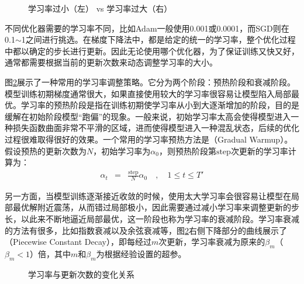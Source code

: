 \begin{figure}[htp]
\centering

\caption{学习率过小（左） vs 学习率过大（右） }
\label{fig:10-25}
\end{figure}

\parinterval 不同优化器需要的学习率不同，比如Adam一般使用0.001或0.0001，而SGD则在0.1$\sim$1之间进行挑选。在梯度下降法中，都是给定的统一的学习率，整个优化过程中都以确定的步长进行更新。因此无论使用哪个优化器，为了保证训练又快又好，通常都需要根据当前的更新次数来动态调整学习率的大小。
\vspace{0.5em}


\parinterval 图\ref{fig:10-26}展示了一种常用的学习率调整策略。它分为两个阶段：预热阶段和衰减阶段。模型训练初期梯度通常很大，如果直接使用较大的学习率很容易让模型陷入局部最优。学习率的预热阶段是指在训练初期使学习率从小到大逐渐增加的阶段，目的是缓解在初始阶段模型“跑偏”的现象。一般来说，初始学习率太高会使得模型进入一种损失函数曲面非常不平滑的区域，进而使得模型进入一种混乱状态，后续的优化过程很难取得很好的效果。一个常用的学习率预热方法是{\small{}}（Gradual Warmup）。假设预热的更新次数为$N$，初始学习率为$\alpha_0$，则预热阶段第$\textrm{step}$次更新的学习率计算为：
\begin{eqnarray}
\alpha_t &=& \frac{\textrm{step}}{N} \alpha_0 \quad,\quad 1 \leq t \leq T'
\label{eq:10-29}
\end{eqnarray}

\noindent 另一方面，当模型训练逐渐接近收敛的时候，使用太大学习率会很容易让模型在局部最优解附近震荡，从而错过局部极小，因此需要通过减小学习率来调整更新的步长，以此来不断地逼近局部最优，这一阶段也称为学习率的衰减阶段。学习率衰减的方法有很多，比如指数衰减以及余弦衰减等，图\ref{fig:10-26}右侧下降部分的曲线展示了{\small{}}（Piecewise Constant Decay），即每经过$m$次更新，学习率衰减为原来的$\beta_m$（$\beta_m<1$）倍，其中$m$和$\beta_m$为根据经验设置的超参。

\begin{figure}[htp]
\centering

\caption{学习率与更新次数的变化关系}
\label{fig:10-26}
\end{figure}

